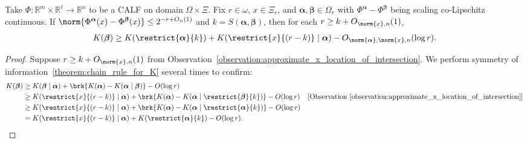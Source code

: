 \begin{corollary}
    \label{corollary:lower_bound_simple_line_parameters}
    Take $\Phi : \mathbb{R}^m \times \mathbb{R}^\ell \to \mathbb{R}^n$ to be a CALF on domain $\Omega \times \Xi$. Fix $r \in \omega$, $x \in \Xi_r$, and $\boldsymbol{\alpha}, \boldsymbol{\beta} \in \Omega_r$ with $\Phi^{\boldsymbol{\alpha}} - \Phi^{\boldsymbol{\beta}}$ being scaling co-Lipschitz continuous. If $\norm{\Phi^{\boldsymbol{\alpha}}(x) - \Phi^{\boldsymbol{\beta}}(x)} \leq 2^{-r + O_n(1)}$ and $k = S(\boldsymbol{\alpha}, \boldsymbol{\beta})$, then for each $r \geq k + O_{\norm{x}, n}(1)$,
    \begin{align*}
        K(\boldsymbol{\beta}) \geq K(\restrict{\boldsymbol{\alpha}}{k}) + K(\restrict{x}{(r - k)} \mid \boldsymbol{\alpha}) - O_{\norm{\boldsymbol{\alpha}}, \norm{x}, n}(\log r).
    \end{align*}
\end{corollary}
\begin{proof}
    
    Suppose $r \geq k + O_{\norm{x}, n}(1)$ from Observation~\ref{observation:approximate_x_location_of_intersection}. We perform symmetry of information~\ref{theorem:chain_rule_for_K} several times to confirm:
    \begin{align*}
        K(\boldsymbol{\beta}) &\geq K(\boldsymbol{\beta} \mid \boldsymbol{\alpha}) + \brk{K(\boldsymbol{\alpha}) - K(\boldsymbol{\alpha} \mid \boldsymbol{\beta})} - O(\log r)\\
        &\geq K(\restrict{x}{(r - k)} \mid \boldsymbol{\alpha}) + \brk{K(\boldsymbol{\alpha}) - K(\boldsymbol{\alpha} \mid \restrict{\boldsymbol{\beta}}{k})} - O(\log r) & [\text{Observation~\ref{observation:approximate_x_location_of_intersection}}]\\
        &\geq K(\restrict{x}{(r - k)} \mid \boldsymbol{\alpha}) + \brk{K(\boldsymbol{\alpha}) - K(\boldsymbol{\alpha} \mid \restrict{\boldsymbol{\alpha}}{k})} - O(\log r)\\
        &= K(\restrict{x}{(r - k)} \mid \boldsymbol{\alpha}) + K(\restrict{\boldsymbol{\alpha}}{k}) - O(\log r).
    \end{align*}
\end{proof}

